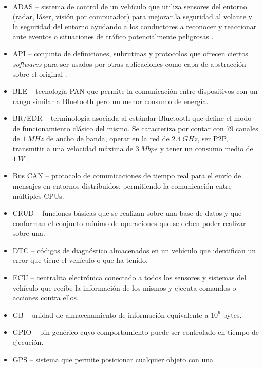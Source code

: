 \begin{itemize}
  \item \ac{ADAS} -- sistema de control de un vehículo que utiliza sensores del entorno
        (radar, láser, visión por computador) para mejorar la seguridad al volante y
        la seguridad del entorno ayudando a los conductores a reconocer y reaccionar
        ante eventos o situaciones de tráfico potencialmente peligrosas \cite{hermawanAcquisitionModelingEvaluating2020}.
  \item \ac{API} -- conjunto de definiciones, subrutinas y protocolos que ofrecen
        ciertos \textit{softwares} para ser usados por otras aplicaciones como
        capa de abstracción sobre el original \cite{InterfazProgramacionAplicaciones2021}.
  \item \ac{BLE} -- tecnología \ac{PAN} que permite la comunicación entre dispositivos
        con un rango similar a Bluetooth pero un menor consumo de energía.
  \item \ac{BR/EDR} -- terminología asociada al estándar Bluetooth que define el modo
        de funcionamiento clásico del mismo. Se caracteriza por contar con 79 canales
        de $1~MHz$ de ancho de banda, operar en la red de $2.4~GHz$, ser \ac{P2P},
        transmitir a una velocidad máxima de $3~Mbps$ y tener un consumo medio de
        $1~W$ \cite{ComparisonBluetoothBR}.
  \item Bus \ac{CAN} -- protocolo de comunicaciones de tiempo real para el envío de
        mensajes en entornos distribuidos, permitiendo la comunicación
        entre múltiples CPUs.
  \item \ac{CRUD} -- funciones básicas que se realizan sobre una base de datos y que
        conforman el conjunto mínimo de operaciones que se deben poder realizar sobre
        una.
  \item \ac{DTC} -- códigos de diagnóstico almacenados en un vehículo que identifican
        un error que tiene el vehículo o que ha tenido.
  \item \ac{ECU} -- centralita electrónica conectado a todos los sensores y sistemas
        del vehículo que recibe la información de los mismos y ejecuta comandos o acciones
        contra ellos.
  \item \ac{GB} -- unidad de almacenamiento de información equivalente a $10^9$ bytes.
  \item \ac{GPIO} -- pin genérico cuyo comportamiento puede ser controlado en tiempo
        de ejecución.
  \item \ac{GPS} -- sistema que permite posicionar cualquier objeto con una 

\end{itemize}
